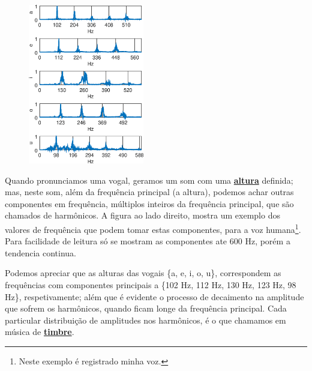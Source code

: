\begin{elaboracion}[title=Timbre das vogais]

\begin{figure}
\begin{center}
\includegraphics[width=0.45\textwidth]{chapters/cap-musica-basica/vocales-fourier.eps}
\end{center}
\end{figure}
Quando pronunciamos uma  vogal, geramos um som com uma \hyperref[sec:pos:Altura]{\textbf{altura}} definida;
mas, neste som, além da  frequência principal (a altura), podemos achar outras componentes em frequência,
múltiplos inteiros da  frequência principal, que são chamados de harmônicos.
A figura ao lado direito, mostra um exemplo dos valores de frequência 
que podem tomar estas componentes, para a voz humana\footnote{Neste exemplo é registrado minha voz.}.
Para facilidade de leitura só se mostram as componentes ate 600 Hz, 
porém a tendencia continua. 

Podemos apreciar que as alturas  das vogais \{a, e, i, o, u\}, 
correspondem as frequências com componentes principais a \{102 Hz, 112 Hz, 130 Hz, 123 Hz, 98 Hz\}, respetivamente;
além que é evidente o processo de decaimento na amplitude que sofrem os harmônicos,
quando ficam longe da frequência principal.
Cada particular distribuição de amplitudes nos harmônicos, 
é o que chamamos em música de \hyperref[sec:pos:timbre]{\textbf{timbre}}.


\end{elaboracion}
